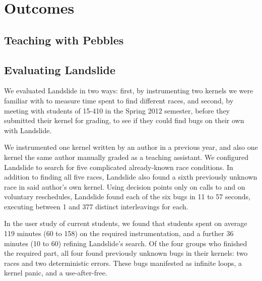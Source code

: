 \section{Outcomes}

\subsection{Teaching with Pebbles}


\subsection{Evaluating Landslide}

We evaluated Landslide in two ways: first, by instrumenting two kernels we were familiar with to measure time spent to find different races, and second, by meeting with students of 15-410 in the Spring 2012 semester, before they submitted their kernel for grading, to see if they could find bugs on their own with Landslide.

We instrumented one kernel written by an author in a previous year, and also one kernel the same author manually graded as a teaching assistant.
We configured Landslide to search for five complicated already-known race conditions.
In addition to finding all five races, Landslide also found a sixth previously unknown race in said author's own kernel.
Using decision points only on calls to  and on voluntary reschedules, Landslide found each of the six bugs in 11 to 57 seconds, executing between 1 and 377 distinct interleavings for each.

In the user study of current students, we found that students spent on average 119 minutes (60 to 158) on the required instrumentation, and a further 36 minutes (10 to 60) refining Landslide's search.
Of the four groups who finished the required part, all four found previously unknown bugs in their kernels: two races and two deterministic errors.
These bugs manifested as infinite loops, a kernel panic, and a use-after-free.
